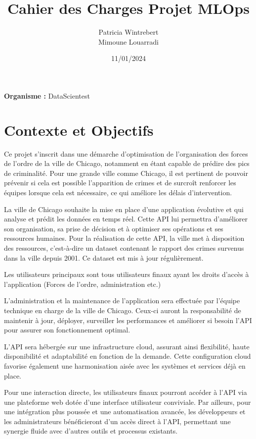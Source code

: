 \documentclass[12pt]{article}
\title{Cahier des Charges Projet MLOps}
\author{Patricia Wintrebert \\ Mimoune Louarradi}
\date{11/01/2024}
\newcommand{\institution}{DataScientest}
\begin{document}
	
\maketitle

\begin{center}
	\large \textbf{Organisme :} \institution
\end{center}

\newpage

\section{Contexte et Objectifs}

Ce projet s’inscrit dans une démarche d’optimisation de l’organisation des forces de l’ordre de la ville de Chicago, notamment en étant capable de prédire des pics de criminalité. Pour une grande ville comme Chicago, il est pertinent de pouvoir prévenir si cela est possible l’apparition de crimes et de surcroît renforcer les équipes lorsque cela est nécessaire, ce qui améliore les délais d’intervention.

La ville de Chicago souhaite la mise en place d’une application évolutive et qui analyse et prédit les données en temps réel. Cette API lui permettra d’améliorer son organisation, sa prise de décision et à optimiser ses opérations et ses ressources humaines. Pour la réalisation de cette API, la ville met à disposition des ressources, c'est-à-dire un dataset contenant le rapport des crimes survenus dans la ville depuis 2001. Ce dataset est mis à jour régulièrement.

Les utilisateurs principaux sont tous utilisateurs finaux ayant les droits d’accès à l’application (Forces de l’ordre, administration etc.)

L’administration et la maintenance de l’application sera effectuée par l’équipe technique en charge de la ville de Chicago. Ceux-ci auront la responsabilité de maintenir à jour, déployer, surveiller les performances et améliorer si besoin l’API pour assurer son fonctionnement optimal.

L'API sera hébergée sur une infrastructure cloud, assurant ainsi flexibilité, haute disponibilité et adaptabilité en fonction de la demande. Cette configuration cloud favorise également une harmonisation aisée avec les systèmes et services déjà en place.

Pour une interaction directe, les utilisateurs finaux pourront accéder à l'API via une plateforme web dotée d'une interface utilisateur conviviale. Par ailleurs, pour une intégration plus poussée et une automatisation avancée, les développeurs et les administrateurs bénéficieront d'un accès direct à l’API, permettant une synergie fluide avec d'autres outils et processus existants.
\end{document}
